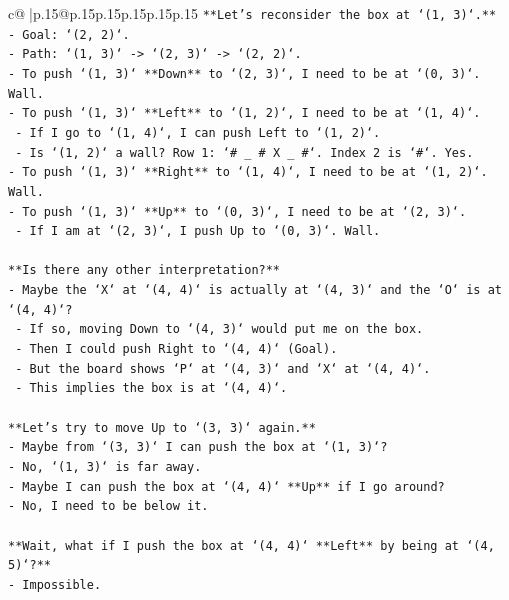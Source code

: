 \documentclass{article}
\begin{document}
{\begin{supertabular}{c@{$\;$}|p{.15\linewidth}@{}p{.15\linewidth}p{.15\linewidth}p{.15\linewidth}p{.15\linewidth}p{.15\linewidth}}
{{{\texttt{**Let's reconsider the box at `(1, 3)`.**} \\
\texttt{{-} Goal: `(2, 2)`.} \\
\texttt{{-} Path: `(1, 3)` {-}> `(2, 3)` {-}> `(2, 2)`.} \\
\texttt{{-} To push `(1, 3)` **Down** to `(2, 3)`, I need to be at `(0, 3)`. Wall.} \\
\texttt{{-} To push `(1, 3)` **Left** to `(1, 2)`, I need to be at `(1, 4)`.} \\
\texttt{  {-} If I go to `(1, 4)`, I can push Left to `(1, 2)`.} \\
\texttt{  {-} Is `(1, 2)` a wall? Row 1: `\# \_ \# X \_ \#`. Index 2 is `\#`. Yes.} \\
\texttt{{-} To push `(1, 3)` **Right** to `(1, 4)`, I need to be at `(1, 2)`. Wall.} \\
\texttt{{-} To push `(1, 3)` **Up** to `(0, 3)`, I need to be at `(2, 3)`.} \\
\texttt{  {-} If I am at `(2, 3)`, I push Up to `(0, 3)`. Wall.} \\
\\ 
\texttt{**Is there any other interpretation?**} \\
\texttt{{-} Maybe the `X` at `(4, 4)` is actually at `(4, 3)` and the `O` is at `(4, 4)`?} \\
\texttt{  {-} If so, moving Down to `(4, 3)` would put me on the box.} \\
\texttt{  {-} Then I could push Right to `(4, 4)` (Goal).} \\
\texttt{  {-} But the board shows `P` at `(4, 3)` and `X` at `(4, 4)`.} \\
\texttt{  {-} This implies the box is at `(4, 4)`.} \\
\\ 
\texttt{**Let's try to move Up to `(3, 3)` again.**} \\
\texttt{{-} Maybe from `(3, 3)` I can push the box at `(1, 3)`?} \\
\texttt{{-} No, `(1, 3)` is far away.} \\
\texttt{{-} Maybe I can push the box at `(4, 4)` **Up** if I go around?} \\
\texttt{{-} No, I need to be below it.} \\
\\ 
\texttt{**Wait, what if I push the box at `(4, 4)` **Left** by being at `(4, 5)`?**} \\
\texttt{{-} Impossible.} \\
\\ 
}}}
\end{supertabular}}
\end{document}
